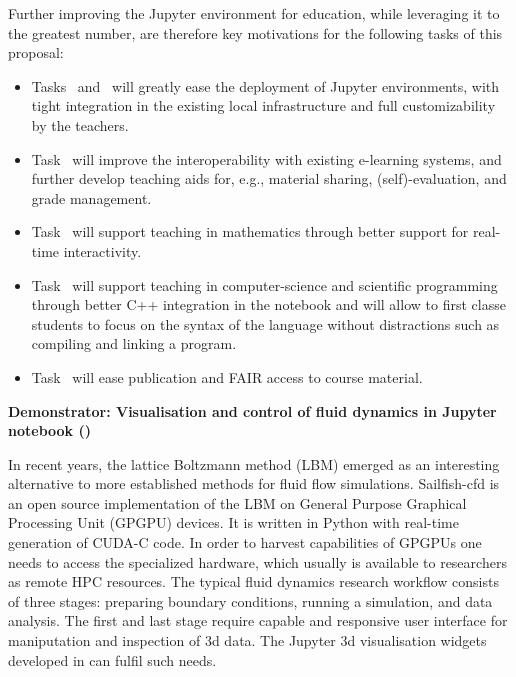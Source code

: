   Further improving the Jupyter environment for education, while
  leveraging it to the greatest number, are therefore key motivations
  for the following tasks of this proposal:
  \begin{itemize}
  \item Tasks~
    and~ will greatly ease the
    deployment of Jupyter environments, with tight integration in the
    existing local infrastructure and full customizability by the
    teachers.
  \item Task~ will improve the
    interoperability with existing e-learning systems, and further
    develop teaching aids for, e.g., material sharing,
    (self)-evaluation, and grade management.
  \item Task~ will support teaching
    in mathematics through better support for real-time interactivity.
  \item Task~ will support teaching
    in computer-science and scientific programming through
    better C++ integration in the notebook and will allow to first classe students to focus on the
    syntax of the language without distractions such as compiling and
    linking a program.
  \item Task~ will ease publication and FAIR
    access to course material.
  \end{itemize}

\medskip
\textbf{Demonstrator: Visualisation and control of fluid dynamics in
  Jupyter notebook ()}\label{sec:concept-demonstrator-gpu}


In recent years, the lattice Boltzmann method (LBM) emerged as an
interesting alternative to more established methods for fluid flow
simulations. Sailfish-cfd \cite{januszewski2014sailfish} is an open
source implementation of the LBM on General Purpose Graphical Processing
Unit (GPGPU) devices. It is written in Python with real-time
generation of CUDA-C code.  In order to harvest capabilities of GPGPUs
one needs to access the specialized hardware, which usually is
available to researchers as remote HPC resources.  The typical fluid
dynamics research workflow consists of three stages: preparing
boundary conditions, running a simulation, and data analysis. The
first and last stage require capable and responsive user interface for
maniputation and inspection of 3d data.  The Jupyter 3d visualisation
widgets developed in  can fulfil
such needs.

